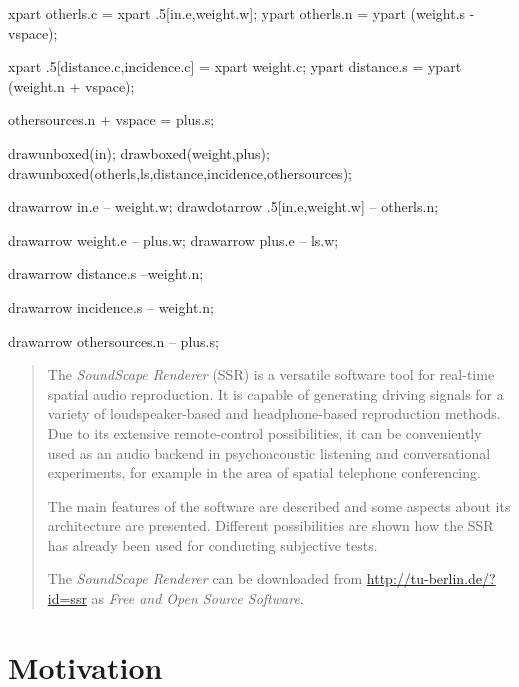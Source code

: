 \documentclass[a4paper]{article}
\begin{document}
\begin{empfile}
\begin{empdef}[aap]
xpart otherls.c = xpart .5[in.e,weight.w];
ypart otherls.n = ypart (weight.s - vspace);

xpart .5[distance.c,incidence.c] = xpart weight.c;
ypart distance.s = ypart (weight.n + vspace);

othersources.n + vspace = plus.s;

drawunboxed(in);
drawboxed(weight,plus);
drawunboxed(otherls,ls,distance,incidence,othersources);

drawarrow in.e -- weight.w;
drawdotarrow .5[in.e,weight.w] -- otherls.n;

drawarrow weight.e -- plus.w;
drawarrow plus.e -- ls.w;

drawarrow distance.s --weight.n;

drawarrow incidence.s -- weight.n;

drawarrow othersources.n -- plus.s;

\end{empdef}

\end{empfile}
\immediate{}

\maketitle

\begin{abstract}
The \emph{SoundScape Renderer} (SSR) is a versatile software tool for
real-time spatial audio reproduction. It is capable of generating driving
signals for a variety of loudspeaker-based and headphone-based reproduction
methods.
Due to its extensive remote-control possibilities, it can be conveniently used
as an audio backend in psychoacoustic listening and conversational
experiments, for example in the area of spatial telephone conferencing.

The main features of the software are described and some aspects about its
architecture are presented. Different possibilities are shown how the SSR has
already been
used for conducting subjective tests.

The \emph{SoundScape Renderer}
can be downloaded from \url{http://tu-berlin.de/?id=ssr}
as \emph{Free and Open Source Software}.
\end{abstract}

\section{Motivation}
\end{document}
